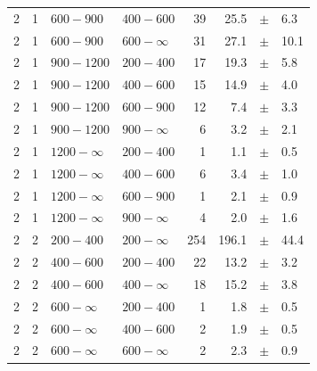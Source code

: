 \begin{table}[!h]
\begin{tabular}{rrllrrcl}
2 & 1 & $ 600- 900$ & $400-600$ &     39 &     25.5 &$\pm$&    6.3 \\
2 & 1 & $ 600- 900$ & $600-\infty$ &     31 &     27.1 &$\pm$&   10.1 \\
2\T & 1 & $ 900-1200$ & $200-400$ &     17 &     19.3 &$\pm$&    5.8 \\
2 & 1 & $ 900-1200$ & $400-600$ &     15 &     14.9 &$\pm$&    4.0 \\
2 & 1 & $ 900-1200$ & $600-900$ &     12 &      7.4 &$\pm$&    3.3 \\
2 & 1 & $ 900-1200$ & $900-\infty$ &      6 &      3.2 &$\pm$&    2.1 \\
2\T & 1 & $1200- \infty$ & $200-400$ &      1 &      1.1 &$\pm$&    0.5 \\
2 & 1 & $1200- \infty$ & $400-600$ &      6 &      3.4 &$\pm$&    1.0 \\
2 & 1 & $1200- \infty$ & $600-900$ &      1 &      2.1 &$\pm$&    0.9 \\
2 & 1 & $1200- \infty$ & $900-\infty$ &      4 &      2.0 &$\pm$&    1.6 \\
2\T & 2 & $ 200- 400$ & $200-\infty$ &    254 &    196.1 &$\pm$&   44.4 \\
2\T & 2 & $ 400- 600$ & $200-400$ &     22 &     13.2 &$\pm$&    3.2 \\
2 & 2 & $ 400- 600$ & $400-\infty$ &     18 &     15.2 &$\pm$&    3.8 \\
2\T & 2 & $ 600- \infty$ & $200-400$ &      1 &      1.8 &$\pm$&    0.5 \\
2 & 2 & $ 600- \infty$ & $400-600$ &      2 &      1.9 &$\pm$&    0.5 \\
2 & 2 & $ 600- \infty$ & $600-\infty$ &      2 &      2.3 &$\pm$&    0.9 \\
    \hline
  \end{tabular}
\end{table}

